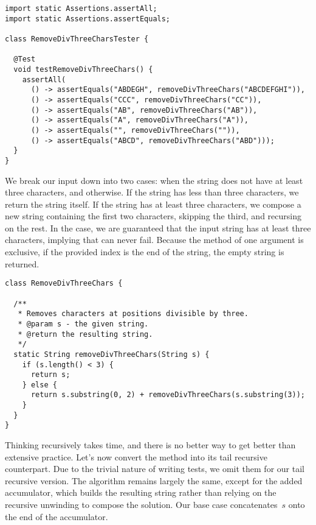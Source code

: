 \begin{lstlisting}[language=MyJava]
import static Assertions.assertAll;
import static Assertions.assertEquals;

class RemoveDivThreeCharsTester {

  @Test
  void testRemoveDivThreeChars() {
    assertAll(
      () -> assertEquals("ABDEGH", removeDivThreeChars("ABCDEFGHI")),
      () -> assertEquals("CCC", removeDivThreeChars("CC")),
      () -> assertEquals("AB", removeDivThreeChars("AB")),
      () -> assertEquals("A", removeDivThreeChars("A")),
      () -> assertEquals("", removeDivThreeChars("")),
      () -> assertEquals("ABCD", removeDivThreeChars("ABD")));
  }
}
\end{lstlisting}

We break our input down into two cases: when the string does not have at least three characters, and otherwise. 
If the string has less than three characters, we return the string itself. 
If the string has at least three characters, we compose a new string containing the first two characters, skipping the third, and recursing on the rest. 
In the  case, we are guaranteed that the input string has at least three characters, implying that  can never fail. 
Because the  method of one argument is exclusive, if the provided index is the end of the string, the empty string is returned.

\begin{lstlisting}[language=MyJava]
class RemoveDivThreeChars {

  /**
   * Removes characters at positions divisible by three.
   * @param s - the given string.
   * @return the resulting string.
   */
  static String removeDivThreeChars(String s) {
    if (s.length() < 3) {
      return s;
    } else {
      return s.substring(0, 2) + removeDivThreeChars(s.substring(3));
    }
  }
}
\end{lstlisting}

Thinking recursively takes time, and there is no better way to get better than extensive practice. Let's now convert the method into its tail recursive counterpart. 
Due to the trivial nature of writing tests, we omit them for our tail recursive version. 
The algorithm remains largely the same, except for the added accumulator, which builds the resulting string rather than relying on the recursive unwinding to compose the solution. 
Our base case concatenates~$s$ onto the end of the accumulator.

